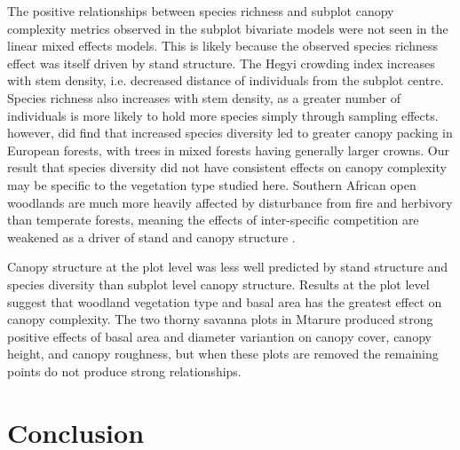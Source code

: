 \documentclass[11pt,a4paper]{article}
\newcommand{\beginsupplement}{%
	\setcounter{table}{0}
	\renewcommand{\thetable}{S\arabic{table}}%
	\setcounter{figure}{0}
	\renewcommand{\thefigure}{S\arabic{figure}}%
}
\begin{document}
The positive relationships between species richness and subplot canopy complexity metrics observed in the subplot bivariate models were not seen in the linear mixed effects models. This is likely because the observed species richness effect was itself driven by stand structure. The Hegyi crowding index increases with stem density, i.e. decreased distance of individuals from the subplot centre. Species richness also increases with stem density, as a greater number of individuals is more likely to hold more species simply through sampling effects. \citet{Jucker2015} however, did find that increased species diversity led to greater canopy packing in European forests, with trees in mixed forests having generally larger crowns. Our result that species diversity did not have consistent effects on canopy complexity may be specific to the vegetation type studied here. Southern African open woodlands are much more heavily affected by disturbance from fire and herbivory than temperate forests, meaning the effects of inter-specific competition are weakened as a driver of stand and canopy structure \citep{}.

Canopy structure at the plot level was less well predicted by stand structure and species diversity than subplot level canopy structure. Results at the plot level suggest that woodland vegetation type and basal area has the greatest effect on canopy complexity. The two thorny savanna plots in Mtarure produced strong positive effects of basal area and diameter variantion on canopy cover, canopy height, and canopy roughness, but when these plots are removed the remaining points do not produce strong relationships. 



\section{Conclusion}

\printbibliography

\end{document}
